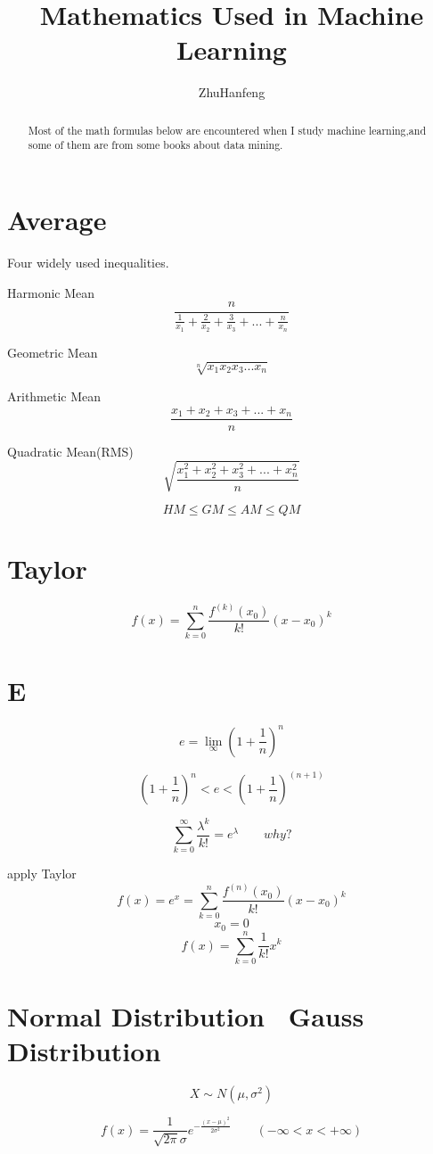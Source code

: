 \documentclass[twocolumn]{article}
\title{Mathematics Used in Machine Learning}
\author{ZhuHanfeng}
\begin{document}
\maketitle

\begin{abstract}
Most of the math formulas below are encountered when I study machine learning,and some of them are from some books about data mining.

\end{abstract}

\section{Average}
Four widely used inequalities.

Harmonic Mean
\[\frac{n}{\frac{1}{x_1} + \frac{2}{x_2} + \frac{3}{x_3} + ... + \frac{n}{x_n}}\]

Geometric Mean
\[\sqrt[n]{x_1x_2x_3...x_n}\]

Arithmetic Mean
\[\frac{x_1 + x_2 + x_3 + ... + x_n}{n}\]

Quadratic Mean(RMS)
\[\sqrt{\frac{x_1^2 + x_2^2 + x_3^2 + ... + x_n^2}{n}}\]

\[HM \leq GM \leq AM \leq QM\]
\section{Taylor}
\[f(x) = \sum_{k=0}^n\frac{f^{(k)}(x_0)}{k!}(x-x_0)^k\]

\section{E}

\[e = \lim\limits_{\infty}(1+\frac{1}{n})^n\]

\[(1+\frac{1}{n})^n < e < (1+\frac{1}{n})^{(n+1)}\]

\[\sum\limits_{k=0}^{\infty}\frac{\lambda^k}{k!} = e^\lambda\qquad why?\]

apply Taylor
\[f(x) = e^x = \sum_{k=0}^n\frac{f^{(n)}(x_0)}{k!}{(x-x_0)^k} \]
\[x_0 = 0\]
\[f(x) = \sum_{k=0}^n\frac{1}{k!}x^k\]



\section{Normal Distribution \ Gauss Distribution}
\[X \sim N(\mu, \sigma^2)\]

\[f(x)=\frac{1}{\sqrt{2\pi}\sigma}e^{-\frac{(x-\mu)^2}{2\sigma^2}}\qquad(-\infty < x < +\infty)\]
\end{document}
